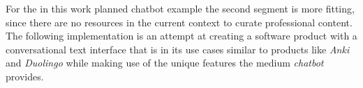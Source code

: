 For the in this work planned chatbot example the second segment is more fitting, since there are no resources in the current context to curate professional content.
\\

The following implementation is an attempt at creating a software product with a conversational text interface that is in its use cases similar to products like \emph{Anki} and \emph{Duolingo} while making use of the unique features the medium \emph{chatbot} provides.
